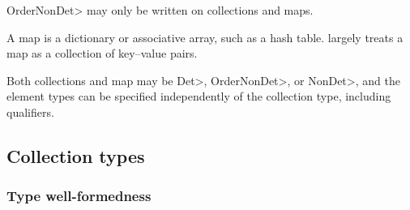 \<OrderNonDet> may only be written on collections and maps.

A map is a dictionary or associative array, such as a hash table.
\OurTypeSystem largely treats a map as a collection of key--value pairs.

Both collections and map may be \<Det>, \<OrderNonDet>, or \<NonDet>, and
the element types can be specified independently of the collection type,
including qualifiers.



\subsection{Collection types}\label{collection-rules}

\subsubsection{Type well-formedness}


